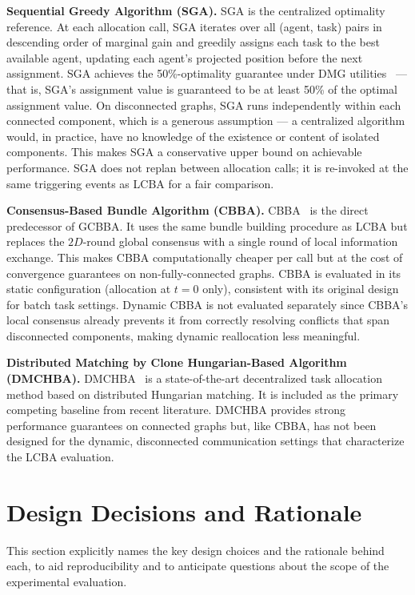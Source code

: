 \textbf{Sequential Greedy Algorithm (SGA).}
SGA is the centralized optimality reference.
At each allocation call, SGA iterates over all (agent, task) pairs in
descending order of marginal gain and greedily assigns each task to the best
available agent, updating each agent's projected position before the next
assignment.
SGA achieves the 50\%-optimality guarantee under DMG
utilities~\cite{fisher1978analysis} --- that is, SGA's assignment value is
guaranteed to be at least 50\% of the optimal assignment value.
On disconnected graphs, SGA runs independently within each connected component,
which is a generous assumption --- a centralized algorithm would, in practice,
have no knowledge of the existence or content of isolated components.
This makes SGA a conservative upper bound on achievable performance.
SGA does not replan between allocation calls; it is re-invoked at the same
triggering events as LCBA for a fair comparison.

\textbf{Consensus-Based Bundle Algorithm (CBBA).}
CBBA~\cite{choi2009consensus} is the direct predecessor of GCBBA.
It uses the same bundle building procedure as LCBA but replaces the $2D$-round
global consensus with a single round of local information exchange.
This makes CBBA computationally cheaper per call but at the cost of convergence
guarantees on non-fully-connected graphs.
CBBA is evaluated in its static configuration (allocation at $t=0$ only),
consistent with its original design for batch task settings.
Dynamic CBBA is not evaluated separately since CBBA's local consensus already
prevents it from correctly resolving conflicts that span disconnected components,
making dynamic reallocation less meaningful.

\textbf{Distributed Matching by Clone Hungarian-Based Algorithm (DMCHBA).}
DMCHBA~\cite{samiei2024dmchba} is a state-of-the-art decentralized task
allocation method based on distributed Hungarian matching.
It is included as the primary competing baseline from recent literature.
DMCHBA provides strong performance guarantees on connected graphs but, like
CBBA, has not been designed for the dynamic, disconnected communication
settings that characterize the LCBA evaluation.


\section{Design Decisions and Rationale}
\label{sec:method_design}

This section explicitly names the key design choices and the rationale behind
each, to aid reproducibility and to anticipate questions about the scope of
the experimental evaluation.

